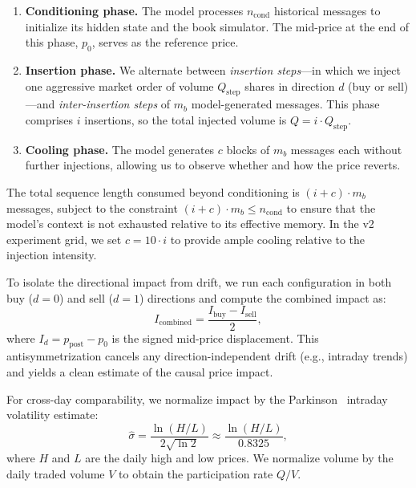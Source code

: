 \documentclass[sigplan,screen,anonymous]{acmart}
\begin{document}
\begin{enumerate}
  \item \textbf{Conditioning phase.} The model processes $n_{\text{cond}}$ historical messages to initialize its hidden state and the book simulator. The mid-price at the end of this phase, $p_0$, serves as the reference price.
  \item \textbf{Insertion phase.} We alternate between \emph{insertion steps}---in which we inject one aggressive market order of volume $Q_{\text{step}}$ shares in direction $d$ (buy or sell)---and \emph{inter-insertion steps} of $m_b$ model-generated messages. This phase comprises $i$ insertions, so the total injected volume is $Q = i \cdot Q_{\text{step}}$.
  \item \textbf{Cooling phase.} The model generates $c$ blocks of $m_b$ messages each without further injections, allowing us to observe whether and how the price reverts.
\end{enumerate}

The total sequence length consumed beyond conditioning is $(i + c) \cdot m_b$ messages, subject to the constraint $(i + c) \cdot m_b \leq n_{\text{cond}}$ to ensure that the model's context is not exhausted relative to its effective memory. In the v2 experiment grid, we set $c = 10 \cdot i$ to provide ample cooling relative to the injection intensity.

To isolate the directional impact from drift, we run each configuration in both buy ($d=0$) and sell ($d=1$) directions and compute the combined impact as:
\begin{equation}
  I_{\text{combined}} = \frac{I_{\text{buy}} - I_{\text{sell}}}{2},
  \label{eq:combined}
\end{equation}
where $I_d = p_{\text{post}} - p_0$ is the signed mid-price displacement. This antisymmetrization cancels any direction-independent drift (e.g., intraday trends) and yields a clean estimate of the causal price impact.

For cross-day comparability, we normalize impact by the Parkinson~\cite{parkinson1980extreme} intraday volatility estimate:
\begin{equation}
  \hat{\sigma} = \frac{\ln(H/L)}{2\sqrt{\ln 2}} \approx \frac{\ln(H/L)}{0.8325},
  \label{eq:parkinson}
\end{equation}
where $H$ and $L$ are the daily high and low prices. We normalize volume by the daily traded volume $V$ to obtain the participation rate $Q/V$.
\end{document}
